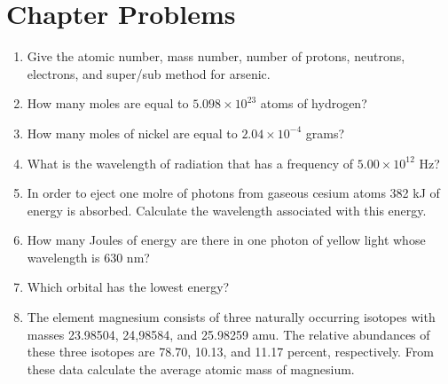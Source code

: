 \documentclass[../hchem.tex]{subfiles}
\begin{document}
\section*{Chapter Problems}
\begin{enumerate}
    \item Give the atomic number, mass number, number of protons, neutrons, electrons, and super/sub method for arsenic.
    \item How many moles are equal to $5.098\times 10^{23}$ atoms of hydrogen?
    \item How many moles of nickel are equal to $2.04\times 10^{-4}$ grams?
    \item What is the wavelength of radiation that has a frequency of $5.00\times 10^{12}$ Hz?
    \item In order to eject one molre of photons from gaseous cesium atoms 382 kJ of energy is absorbed. Calculate the wavelength associated with this energy.
    \item How many Joules of energy are there in one photon of yellow light whose wavelength is 630 nm?
    \item Which orbital has the lowest energy?
    \item The element magnesium consists of three naturally occurring isotopes with masses 23.98504, 24,98584, and 25.98259 amu. The relative abundances of these three isotopes are 78.70, 10.13, and 11.17 percent, respectively. From these data calculate the average atomic mass of magnesium.    
\end{enumerate}
\end{document}
